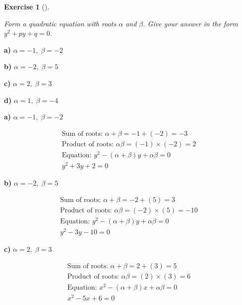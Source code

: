 \documentclass[
  letterpaper,
  DIV=11,
  numbers=noendperiod]{scrreprt}
\theoremstyle{definition}
\newtheorem{exercise}{Exercise}[chapter]
\theoremstyle{remark}
\begin{document}
\begin{exercise}[]\protect\hypertarget{exr-u6-27}{}\label{exr-u6-27}

\emph{Form a quadratic equation with roots \(\alpha\) and \(\beta\).
Give your answer in the form \(y^2 + py + q = 0\).}

\textbf{a)} \(\displaystyle \alpha = -1,\; \beta = -2\)

\textbf{b)} \(\displaystyle \alpha = -2,\; \beta = 5\)

\textbf{c)} \(\displaystyle \alpha = 2,\; \beta = 3\)

\textbf{d)} \(\displaystyle \alpha = 1,\; \beta = -4\)

\begin{tcolorbox}[enhanced jigsaw, opacitybacktitle=0.6, coltitle=black, arc=.35mm, colframe=quarto-callout-tip-color-frame, colback=white, bottomrule=.15mm, left=2mm, colbacktitle=quarto-callout-tip-color!10!white, titlerule=0mm, opacityback=0, title=\textcolor{quarto-callout-tip-color}{\faLightbulb}\hspace{0.5em}{🔍 View Solutions}, leftrule=.75mm, breakable, rightrule=.15mm, bottomtitle=1mm, toptitle=1mm, toprule=.15mm]

\textbf{a)} \(\displaystyle \alpha = -1,\; \beta = -2\)

\begin{align*}
\text{Sum of roots: } \alpha + \beta = -1 + (-2) = -3 \\ \text{Product of roots: } \alpha\beta = (-1) \times (-2) = 2 \\ \text{Equation: } y^2 - (\alpha+\beta)y + \alpha\beta = 0 \\ y^2 + 3y + 2 = 0
\end{align*}

\textbf{b)} \(\displaystyle \alpha = -2,\; \beta = 5\)

\begin{align*}
\text{Sum of roots: } \alpha + \beta = -2 + (5) = 3 \\ \text{Product of roots: } \alpha\beta = (-2) \times (5) = -10 \\ \text{Equation: } y^2 - (\alpha+\beta)y + \alpha\beta = 0 \\ y^2 - 3y - 10 = 0
\end{align*}

\textbf{c)} \(\displaystyle \alpha = 2,\; \beta = 3\)

\begin{align*}
\text{Sum of roots: } \alpha + \beta = 2 + (3) = 5 \\ \text{Product of roots: } \alpha\beta = (2) \times (3) = 6 \\ \text{Equation: } x^2 - (\alpha+\beta)x + \alpha\beta = 0 \\ x^2 - 5x + 6 = 0
\end{align*}


\end{tcolorbox}
\end{exercise}
\end{document}
